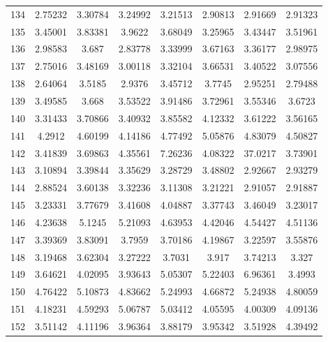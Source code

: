 \begin{center}
\begin{longtable}{cccccccc}
134 & 2.75232 & 3.30784 & 3.24992 & 3.21513 & 2.90813 & 2.91669 & 2.91323\\
135 & 3.45001 & 3.83381 & 3.9622 & 3.68049 & 3.25965 & 3.43447 & 3.51961\\
136 & 2.98583 & 3.687 & 2.83778 & 3.33999 & 3.67163 & 3.36177 & 2.98975\\
137 & 2.75016 & 3.48169 & 3.00118 & 3.32104 & 3.66531 & 3.40522 & 3.07556\\
138 & 2.64064 & 3.5185 & 2.9376 & 3.45712 & 3.7745 & 2.95251 & 2.79488\\
139 & 3.49585 & 3.668 & 3.53522 & 3.91486 & 3.72961 & 3.55346 & 3.6723\\
140 & 3.31433 & 3.70866 & 3.40932 & 3.85582 & 4.12332 & 3.61222 & 3.56165\\
141 & 4.2912 & 4.60199 & 4.14186 & 4.77492 & 5.05876 & 4.83079 & 4.50827\\
142 & 3.41839 & 3.69863 & 4.35561 & 7.26236 & 4.08322 & 37.0217 & 3.73901\\
143 & 3.10894 & 3.39844 & 3.35629 & 3.28729 & 3.48802 & 2.92667 & 2.93279\\
144 & 2.88524 & 3.60138 & 3.32236 & 3.11308 & 3.21221 & 2.91057 & 2.91887\\
145 & 3.23331 & 3.77679 & 3.41608 & 4.04887 & 3.37743 & 3.46049 & 3.23017\\
146 & 4.23638 & 5.1245 & 5.21093 & 4.63953 & 4.42046 & 4.54427 & 4.51136\\
147 & 3.39369 & 3.83091 & 3.7959 & 3.70186 & 4.19867 & 3.22597 & 3.55876\\
148 & 3.19468 & 3.62304 & 3.27222 & 3.7031 & 3.917 & 3.74213 & 3.327\\
149 & 3.64621 & 4.02095 & 3.93643 & 5.05307 & 5.22403 & 6.96361 & 3.4993\\
150 & 4.76422 & 5.10873 & 4.83662 & 5.24993 & 4.66872 & 5.24938 & 4.80059\\
151 & 4.18231 & 4.59293 & 5.06787 & 5.03412 & 4.05595 & 4.00309 & 4.09136\\
152 & 3.51142 & 4.11196 & 3.96364 & 3.88179 & 3.95342 & 3.51928 & 4.39492\\
\end{longtable}
\end{center} 


